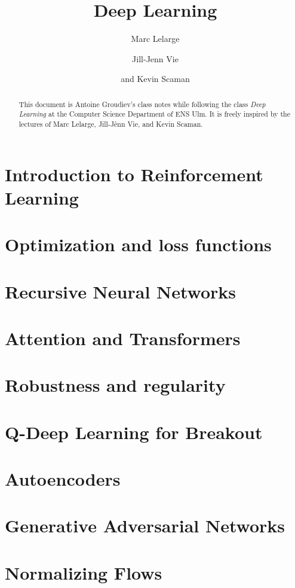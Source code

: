\documentclass[toc, titlepaged]{../cs-classes/cs-classes}
\title{Deep Learning}
\author{Marc Lelarge\and Jill-Jenn Vie\and and Kevin Scaman}
\begin{document}
\begin{abstract}
    This document is Antoine Groudiev's class notes while following the class \emph{Deep Learning} at the Computer Science Department of ENS Ulm. It is freely inspired by the lectures of Marc Lelarge, Jill-Jênn Vie, and Kevin Scaman. 
\end{abstract}



\newpage

\newpage

\section{Introduction to Reinforcement Learning}

\section{Optimization and loss functions}



\section{Recursive Neural Networks}

\section{Attention and Transformers}

\section{Robustness and regularity}

\section{Q-Deep Learning for Breakout}

\section{Autoencoders}

\section{Generative Adversarial Networks}

\section{Normalizing Flows}
\end{document}
